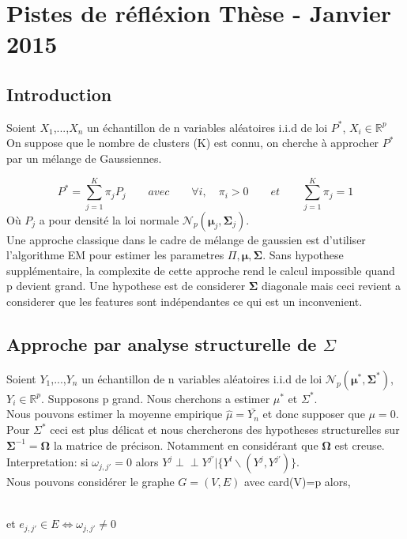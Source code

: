 \documentclass[12pt]{article}
\let\bb\mathbb       %
\def\RR{{\bb R}}\def\ZZ{{\bb Z}}\def\FF{{\bb F}}\def\DD{{\bb D}}
\def\bb{\mathbb}
\def\hat{\widehat}
\def\bSigma{\boldsymbol\Sigma}
\def\bOmega{\boldsymbol\Omega}
\def\bmu{\boldsymbol\mu}
\def\ci{\perp\!\!\!\perp}
\begin{document}
\section{Pistes de réfléxion Thèse - Janvier 2015}
\subsection{Introduction}

Soient $X_1$,...,$X_n$ un échantillon de n variables aléatoires i.i.d de loi $P^*$, $X_i\in\RR^p$
\\
On suppose que le nombre de clusters (K) est connu, on cherche à approcher $P^*$ par un mélange de Gaussiennes.

$$
P^* = \sum_{j=1}^K \pi_jP_j \qquad avec \qquad \forall i, \quad \pi_i>0 \qquad et \qquad \sum_{j=1}^K\pi_j=1
$$
Où $P_j$ a pour densité la loi normale  $\mathcal N_p(\bmu_j,\bSigma_j)$.
\\

Une approche classique dans le cadre de mélange de gaussien est d'utiliser l'algorithme EM pour estimer les parametres $\Pi,\bmu,\bSigma$. Sans hypothese supplémentaire, la complexite de cette approche rend le calcul impossible quand p devient grand. Une hypothese est de considerer $\bSigma$ diagonale mais ceci revient a considerer que les features sont indépendantes ce qui est un inconvenient.

\subsection{Approche par analyse structurelle de $\Sigma$}

Soient $Y_1$,...,$Y_n$ un échantillon de n variables aléatoires i.i.d de loi $\mathcal N_p(\bmu^*,\bSigma^*)$, $Y_i\in\RR^p$. Supposons p grand. Nous cherchons a estimer $\mu^*$ et $\Sigma^*$.
\\
Nous pouvons estimer la moyenne empirique $\hat{\mu}=\bar{Y_n}$ et donc supposer que $\mu=0$. Pour $\Sigma^*$ ceci est plus délicat et nous chercherons des hypotheses structurelles sur $\bSigma^{-1}=\bOmega$ la matrice de précison. Notamment en considérant que $\bOmega$ est creuse.
Interpretation: si $\omega_{j,j'}=0$ alors $Y^j \ci Y^{j'}|\{Y^l\backslash (Y^j,Y^{j'})\}$.\\
Nous pouvons considérer le graphe $G=(V,E)$ avec card(V)=p alors,
\begin{figure}[!h]
\centering
{}
\end{figure}
\\
et $e_{j,j'}\in E \iff \omega_{j,j'} \neq 0$
\end{document}
